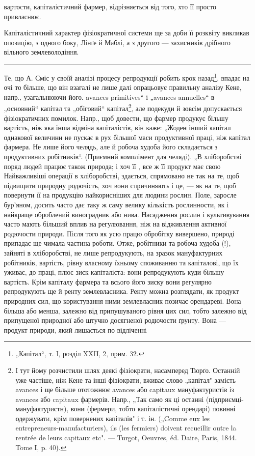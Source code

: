 \parcont{}  %
вартости, капіталістичний фармер, відрізняється від того, хто її просто
привласнює.

Капіталістичний характер фізіократичної системи ще за доби її розквіту
викликав опозицію, з одного боку, Лінґе й Маблі, а з другого —
захисників дрібного вільного землеволодіння.
\pfbreak
Те, що А. Сміс у своїй аналізі процесу репродукції робить крок
назад\footnote{
„Капітал“, т. І, розділ XXII, 2, прим. 32.
}, впадає на очі то більше, що він взагалі не лише далі опрацьовує
правильну аналізу Кене, напр., узагальнюючи його. avances primitives“
і „avances annuelles“ в „основний“ капітал та „обіговий“
капітал\footnote{
І тут йому розчистили шлях деякі фізіократи, насамперед Тюрґо. Останній
уже частіше, ніж Кене та інші фізіократи, вживає слово „капітал" замість avances
і ще більше ототожнює avances або capitaux мануфактуристів із avances або
capitaux фармерів. Напр., „Так само як ці останні (підприємці-мануфактуристн),
вони (фермери, тобто капіталістичні орендарі) повинні одержувати, крім повернених
капіталів" і т. ін. („Comme eux les entrepreneurs-manufacturiers), ils (les fermiers)
doivent recueillir outre la rentrée de leurs capitaux etc". — Turgot, Oeuvres, éd.
Daire, Paris, 1844. Tome I, p. 40).
}, але подекуди й зовсім допускається фізіократичних помилок.
Напр., щоб довести, що фармер продукує більшу вартість, ніж яка інша
відміна капіталістів, він каже: „Жоден інший капітал однакової величини
не пускає в рух більшої маси продуктивної праці, ніж капітал фармера.
Не лише його челядь, але й робоча худоба його складається з продуктивних
робітників“. (Приємний комплімент для челяді). „В хліборобстві
поряд людей працює також природа; і хоч її , все ж її продукт має свою 
Найважливіші операції в хліборобстві, здається, спрямовано не так на те,
щоб підвищити природну родючість, хоч вони спричиняють і це, — як
на те, щоб повернути її на продукцію найкорисніших для людини рослин.
Поле, заросле бур’яном, досить часто дає таку ж саму велику
кількість рослинности, як і найкраще оброблений виноградник або
нива. Насадження рослин і культивування часто мають більший вплив на
регулювання, ніж на відживлення активної родючости природи. Після
того як усю працю обробітку вивершено, природі припадає ще чимала
частина роботи. Отже, робітники та робоча худоба (!), зайняті в хліборобстві,
не лише репродукують, на зразок мануфактурних робітників,
вартість, рівну власному їхньому споживанню та капіталові, що їх уживає,
до праці, плюс зиск капіталіста: вони репродукують куди більшу вартість.
Крім капіталу фармера та всього його зиску вони регулярно репродукують
ще й ренту землевласника. Ренту можна розглядати, як продукт
природних сил, що користування ними землевласник позичає орендареві.
Вона більша або менша, залежно від припушуваного рівня цих сил,
тобто залежно від припущеної природної або штучно досягненої родючости
ґрунту. Вона — продукт природи, який лишається по відліченні
\parbreak{}  %
